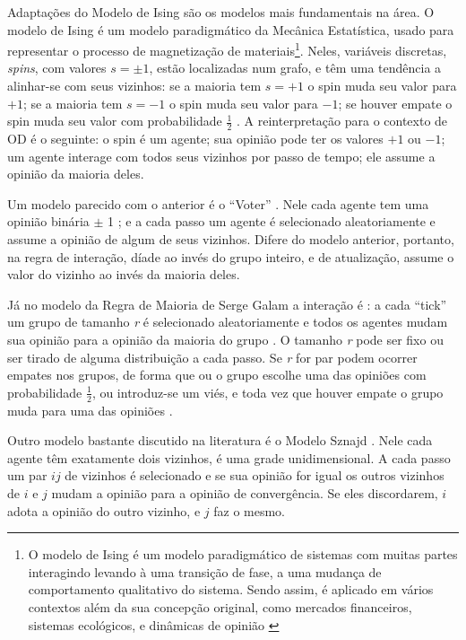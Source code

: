   Adaptações do Modelo de Ising são os modelos mais fundamentais na área. O
  modelo de Ising é um modelo paradigmático da Mecânica Estatística, usado para
  representar o processo de magnetização de materiais\footnote{O modelo de Ising
    é um modelo paradigmático de sistemas com muitas partes interagindo levando
    à uma transição de fase, a uma mudança de comportamento qualitativo do
    sistema. Sendo assim, é aplicado em vários contextos além da sua concepção
    original, como mercados financeiros, sistemas ecológicos, e dinâmicas de
    opinião \cite{sole2011phase}}. Neles, variáveis discretas, \textit{spins},
  com valores $s = \pm 1$, estão localizadas num grafo, e têm uma tendência a
  alinhar-se com seus vizinhos: se a maioria tem \(s = + 1 \) o spin muda seu
  valor para \(+1\); se a maioria tem \(s = -1 \) o spin muda seu valor para
  \(-1\); se houver empate o spin muda seu valor com probabilidade
  \(\frac{1}{2}\) \cite{castellano2012social,sole2011phase}. A reinterpretação
  para o contexto de OD é o seguinte: o spin é um agente; sua opinião pode ter
  os valores \(+1\) ou \(-1\); um agente interage com todos seus vizinhos por
  passo de tempo; ele assume a opinião da maioria deles.

  Um modelo parecido com o anterior é o ``Voter'' \cite{holley1975ergodic}. Nele
  cada agente tem uma opinião binária \(\pm\) 1 ; e a cada passo um agente é
  selecionado aleatoriamente e assume a opinião de algum de seus vizinhos.
  Difere do modelo anterior, portanto, na regra de interação, díade ao invés do
  grupo inteiro, e de atualização, assume o valor do vizinho ao invés da maioria
  deles.


  Já no modelo da Regra de Maioria de Serge Galam a interação é : a cada
  ``tick'' um grupo de tamanho \textit{r} é selecionado aleatoriamente e todos
  os agentes mudam sua opinião para a opinião da maioria do grupo
  \cite{galam1990social,galam2012sociophysics}. O tamanho \textit{r} pode ser
  fixo ou ser tirado de alguma distribuição a cada passo. Se \textit{r} for par
  podem ocorrer empates nos grupos, de forma que ou o grupo escolhe uma das
  opiniões com probabilidade \(\frac{1}{2}\), ou introduz-se um viés, e toda vez
  que houver empate o grupo muda para uma das opiniões
  \cite{galam2012sociophysics, galam1986majority}.

  Outro modelo bastante discutido na literatura é o Modelo Sznajd
  \cite{sznajd2000opinion}. Nele cada agente têm exatamente dois vizinhos, é uma
  grade unidimensional. A cada passo um par $ij$ de vizinhos é selecionado e se
  sua opinião for igual os outros vizinhos de \(i\) e \(j\) mudam a opinião para
  a opinião de convergência. Se eles discordarem, \(i\) adota a opinião do outro
  vizinho, e \(j\) faz o mesmo.

